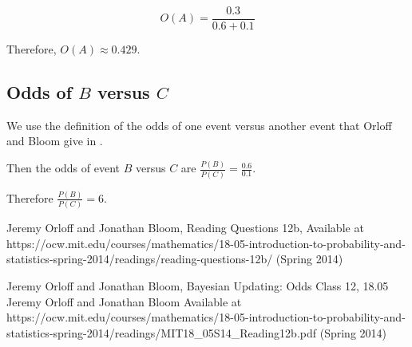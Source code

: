 \documentclass{article}
\begin{document}
\begin{equation}
O\left(A\right) = \frac{0.3}{0.6+ 0.1}
\end{equation}

Therefore, $O\left(A\right) \approx 0.429$.

\subsection{Odds of $B$ versus $C$}

We use the definition of the odds of one event versus another event that Orloff 
and Bloom give in \cite{reading12b}.

Then the odds of event $B$ versus $C$ are 
$\frac{P\left(B\right)}{P\left(C\right)}=\frac{0.6}{0.1}$. 

Therefore $\frac{P\left(B\right)}{P\left(C\right)}=6$.

\begin{thebibliography}{99}
Jeremy Orloff and Jonathan Bloom,
Reading Questions 12b,
Available at https://ocw.mit.edu/courses/mathematics/18-05-introduction-to-probability-and-statistics-spring-2014/readings/reading-questions-12b/
(Spring 2014)

Jeremy Orloff and Jonathan Bloom,
Bayesian Updating: Odds Class 12, 18.05 Jeremy Orloff and Jonathan Bloom
Available at https://ocw.mit.edu/courses/mathematics/18-05-introduction-to-probability-and-statistics-spring-2014/readings/MIT18_05S14_Reading12b.pdf
(Spring 2014)

\end{thebibliography}
\end{document}
